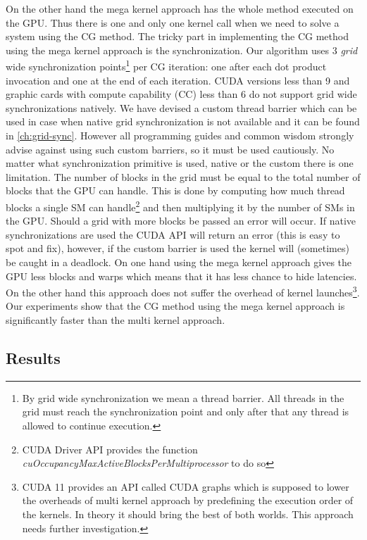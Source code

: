 On the other hand the mega kernel approach has the whole method executed on the GPU. Thus there is one and only one kernel call when we need to solve a system using the CG method. The tricky part in implementing the CG method using the mega kernel approach is the synchronization. Our algorithm uses 3 \textit{grid} wide synchronization points\footnote{By grid wide synchronization we mean a thread barrier. All threads in the grid must reach the synchronization point and only after that any thread is allowed to continue execution.} per CG iteration: one after each dot product invocation and one at the end of each iteration. CUDA versions less than 9 and graphic cards with compute capability (CC) less than 6 do not support grid wide synchronizations natively. We have devised a custom thread barrier which can be used in case when native grid synchronization is not available and it can be found in \cref{ch:grid-sync}. However all programming guides and common wisdom strongly advise against using such custom barriers, so it must be used cautiously. No matter what synchronization primitive is used, native or the custom there is one limitation. The number of blocks in the grid must be equal to the total number of blocks that the GPU can handle. This is done by computing how much thread blocks a single SM can handle\footnote{CUDA Driver API provides the function \textit{cuOccupancyMaxActiveBlocksPerMultiprocessor} to do so} and then multiplying it by the number of SMs in the GPU. Should a grid with more blocks be passed an error will occur. If native synchronizations are used the CUDA API will return an error (this is easy to spot and fix), however, if the custom barrier is used the kernel will (sometimes) be caught in a deadlock. On one hand using the mega kernel approach gives the GPU less blocks and warps which means that it has less chance to hide latencies. On the other hand this approach does not suffer the overhead of kernel launches\footnote{CUDA 11 provides an API called CUDA graphs which is supposed to lower the overheads of multi kernel approach by predefining the execution order of the kernels. In theory it should bring the best of both worlds. This approach needs further investigation.}. Our experiments show that the CG method using the mega kernel approach is significantly faster than the multi kernel approach.

\subsection{Results}

